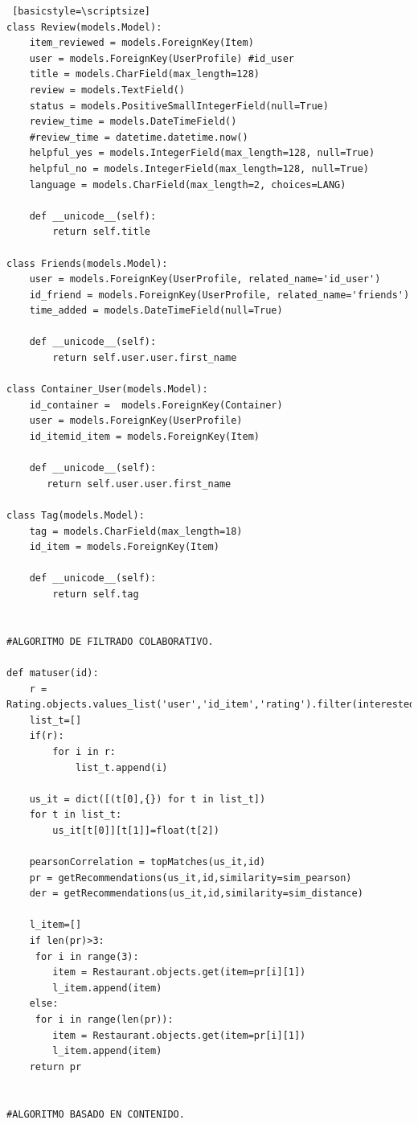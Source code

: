\documentclass[12pt,letterpaper,oneside] {memoir}
\begin{document}
\begin{lstlisting} [basicstyle=\scriptsize]
class Review(models.Model):
    item_reviewed = models.ForeignKey(Item)
    user = models.ForeignKey(UserProfile) #id_user
    title = models.CharField(max_length=128)
    review = models.TextField()
    status = models.PositiveSmallIntegerField(null=True)
    review_time = models.DateTimeField()
    #review_time = datetime.datetime.now()
    helpful_yes = models.IntegerField(max_length=128, null=True)
    helpful_no = models.IntegerField(max_length=128, null=True)
    language = models.CharField(max_length=2, choices=LANG)
    
    def __unicode__(self):
        return self.title
    
class Friends(models.Model):
    user = models.ForeignKey(UserProfile, related_name='id_user')
    id_friend = models.ForeignKey(UserProfile, related_name='friends') 
    time_added = models.DateTimeField(null=True)
    
    def __unicode__(self):
        return self.user.user.first_name

class Container_User(models.Model):
    id_container =  models.ForeignKey(Container)  
    user = models.ForeignKey(UserProfile)
    id_itemid_item = models.ForeignKey(Item)
    
    def __unicode__(self):
       return self.user.user.first_name

class Tag(models.Model):
    tag = models.CharField(max_length=18)
    id_item = models.ForeignKey(Item) 
    
    def __unicode__(self):
        return self.tag


#ALGORITMO DE FILTRADO COLABORATIVO.

def matuser(id):  
    r = Rating.objects.values_list('user','id_item','rating').filter(interested=0)
    list_t=[]
    if(r):
        for i in r:
            list_t.append(i)
    
    us_it = dict([(t[0],{}) for t in list_t])
    for t in list_t:
        us_it[t[0]][t[1]]=float(t[2])
    
    pearsonCorrelation = topMatches(us_it,id) 
    pr = getRecommendations(us_it,id,similarity=sim_pearson)
    der = getRecommendations(us_it,id,similarity=sim_distance)
    
    l_item=[]
    if len(pr)>3:
     for i in range(3):
        item = Restaurant.objects.get(item=pr[i][1])
        l_item.append(item)
    else:
     for i in range(len(pr)):
        item = Restaurant.objects.get(item=pr[i][1])
        l_item.append(item)
    return pr 


#ALGORITMO BASADO EN CONTENIDO.


\end{lstlisting}
\end{document}
